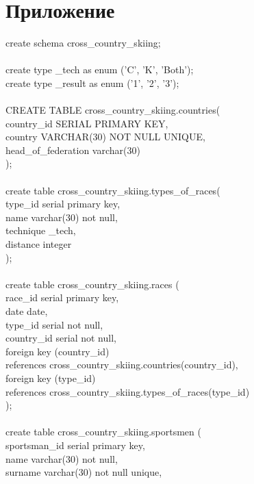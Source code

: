\documentclass[a4paper,12pt]{article}
\begin{document}
\section{Приложение}
create schema cross\_country\_skiing;\\
\\
create type \_tech as enum ('C', 'K', 'Both');\\
create type \_result as enum ('1', '2', '3');\\
\\
CREATE TABLE cross\_country\_skiing.countries(\\
\indent country\_id SERIAL PRIMARY KEY,\\
\indent country VARCHAR(30) NOT NULL UNIQUE,\\
\indent head\_of\_federation varchar(30)\\
);\\
\\
create table cross\_country\_skiing.types\_of\_races(\\
\indent type\_id serial primary key,\\
\indent name varchar(30) not null,\\
\indent technique \_tech,\\
\indent distance integer\\
);\\
\\
create table cross\_country\_skiing.races (\\
\indent race\_id serial primary key,\\
\indent date date,\\
\indent type\_id serial not null,\\
\indent country\_id serial not null,\\
\indent foreign key (country\_id)\\
\indent \indent references cross\_country\_skiing.countries(country\_id),\\
\indent foreign key (type\_id)\\
\indent \indent references cross\_country\_skiing.types\_of\_races(type\_id)\\
);\\
\\
create table cross\_country\_skiing.sportsmen (\\
\indent sportsman\_id serial primary key,\\
\indent name varchar(30) not null,\\
\indent surname varchar(30) not null unique,\\
\end{document}
